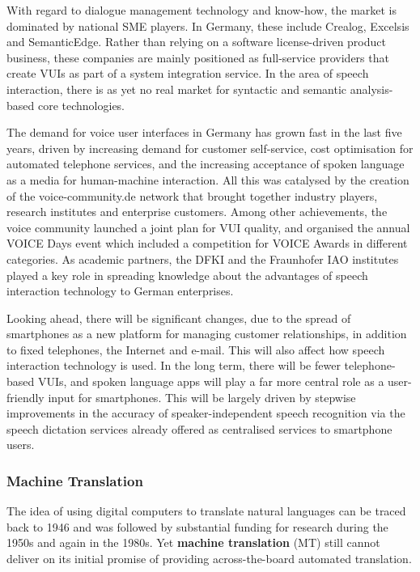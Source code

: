 \begin{multicols}{2}
With regard to dialogue management technology and know-how, the market is dominated by national SME players. In Germany, these include Crealog, Excelsis and SemanticEdge. Rather than relying on a software license-driven product business, these companies are mainly positioned as full-service providers that create VUIs as part of a system integration service. In the area of speech interaction, there is as yet no real market for syntactic and semantic analysis-based core technologies.

The demand for voice user interfaces in Germany has grown fast in the last five years, driven by increasing demand for customer self-service, cost optimisation for automated telephone services, and the increasing acceptance of spoken language as a media for human-machine interaction. All this was catalysed by the creation of the voice-community.de network that brought together industry players, research institutes and enterprise customers. Among other achievements, the voice community launched a joint plan for VUI quality, and organised the annual VOICE Days event which included a competition for VOICE Awards in different categories. As academic partners, the DFKI and the Fraunhofer IAO institutes played a key role in spreading knowledge about the advantages of speech interaction technology to German enterprises.

Looking ahead, there will be significant changes, due to the spread of smartphones as a new platform for managing customer relationships, in addition to fixed telephones, the Internet and e-mail. This will also affect how speech interaction technology is used. In the long term, there will be fewer telephone-based VUIs, and spoken language apps will play a far more central role as a user-friendly input for smartphones. This will be largely driven by stepwise improvements in the accuracy of speaker-independent speech recognition via the speech dictation services already offered as centralised services to smartphone users.

\subsubsection{Machine Translation}

The idea of using digital computers to translate natural languages can be traced back to 1946 and was followed by substantial funding for research during the 1950s and again in the 1980s. Yet \textbf{machine translation} (MT) still cannot deliver on its initial promise of providing across-the-board automated translation.


\end{multicols}
